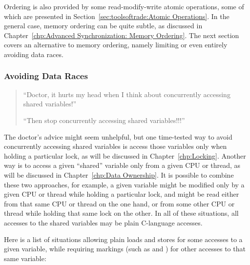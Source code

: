\QuickQuizEnd

Ordering is also provided by some read-modify-write atomic
operations, some of which are presented in
Section~\ref{sec:toolsoftrade:Atomic Operations}.
In the general case, memory ordering can be quite subtle, as
discussed in
Chapter~\ref{chp:Advanced Synchronization: Memory Ordering}.
The next section covers an alternative to memory ordering, namely
limiting or even entirely avoiding data races.

\subsubsection{Avoiding Data Races}
\label{sec:toolsoftrade:Avoiding Data Races}

\begin{quote}
``Doctor, it hurts my head when I think about concurrently accessing
shared variables!''

``Then stop concurrently accessing shared variables!!!''
\end{quote}

The doctor's advice might seem unhelpful, but
one time-tested way to avoid concurrently accessing shared variables
is access those variables only when holding a particular lock, as will
be discussed in Chapter~\ref{chp:Locking}.
Another way is to access a given ``shared'' variable only from a given
CPU or thread, as will be discussed in
Chapter~\ref{chp:Data Ownership}.
It is possible to combine these two approaches, for example, a given
variable might be modified only by a given CPU or thread while holding a
particular lock, and might be read either from that same CPU or thread
on the one hand, or from some other CPU or thread while holding that
same lock on the other.
In all of these situations, all accesses to the shared variables may
be plain C-language accesses.

Here is a list of situations
allowing plain loads and stores for some accesses to a given variable,
while requiring markings (such as  and )
for other accesses to that same variable:

